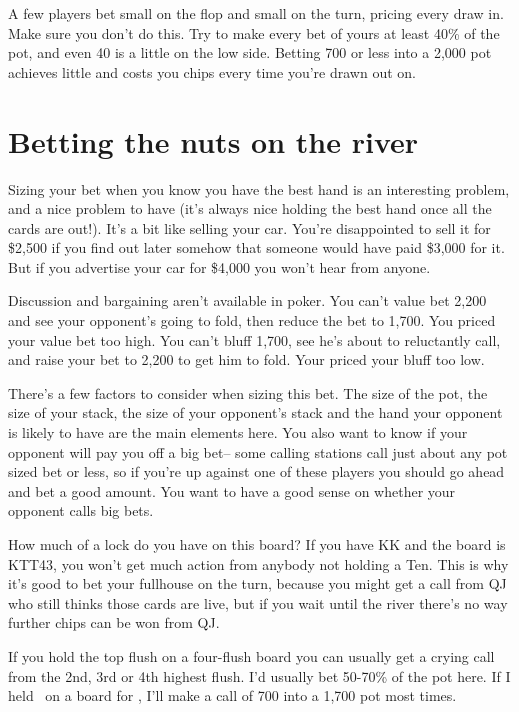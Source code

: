A few players bet small on the flop and small on the turn, pricing every draw
in. Make sure you don't do this. Try to make every bet of yours at least
40\% of the pot, and even 40 is a little on the low side. Betting 700
or less into a 2,000 pot achieves little and costs you chips every
time you're drawn out on.

\section{Betting the nuts on the river}

Sizing your bet when you know you have the best hand is an interesting problem,
and a nice problem to have (it's always nice holding the best hand once all
the cards are out!). It's a bit like selling your car. You're disappointed to
sell it for \$2,500 if you find out later somehow that someone would have paid
\$3,000 for it. But if you advertise your car for \$4,000 you won't hear from
anyone.

Discussion and bargaining aren't available in poker. You can't value
bet 2,200 and see your opponent's going to fold, then reduce
the bet to 1,700. You priced your value bet too high.
You can't bluff 1,700, see he's about to reluctantly call, and raise
your bet to 2,200 to get him to fold. Your priced your bluff too low.

There's a few factors to consider when sizing this bet. The size of the pot, the
size of your stack, the size of your opponent's stack and the hand your
opponent is likely to have are the main elements here. You also want to know
if your opponent will pay you off a big bet-- some calling stations call just
about any pot sized bet or less, so if you're up against one of these players
you should go ahead and bet a good amount. You want to have a good sense
on whether your opponent calls big bets.


How much of a lock do you have on this board? If you have KK and the
board is KTT43, you won't get much action from anybody not holding a Ten.
This is why it's good to bet your fullhouse on the turn, because you might
get a call from QJ who still thinks those cards are live, but if you wait
until the river there's no way further chips can be won from QJ.

If you hold the top flush on a four-flush board you can usually get a crying
call from the 2nd, 3rd or 4th highest flush. I'd usually bet 50-70\% of the
pot here. If I held \Jh\tens\ on a board for \Ah\tenh\nines\fiveh\fourh, I'll
make a call of 700 into a 1,700 pot most times.

